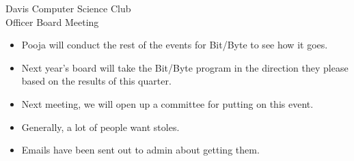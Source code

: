 \documentclass{article}
\begin{document}
\begin{Minutes}{Davis Computer Science Club\\Officer Board Meeting}
\begin{itemize}
    \item Pooja will conduct the rest of the events for Bit/Byte to see how it goes.
    \item Next year's board will take the Bit/Byte program in the direction they please based on the results of this quarter.
\end{itemize}

\begin{itemize}
    \item Next meeting, we will open up a committee for putting on this event. 
\end{itemize}

\begin{itemize}
    \item Generally, a lot of people want stoles. 
    \item Emails have been sent out to admin about getting them.
\end{itemize}

\thispagestyle{creditfooter}

\end{Minutes}
\end{document}

